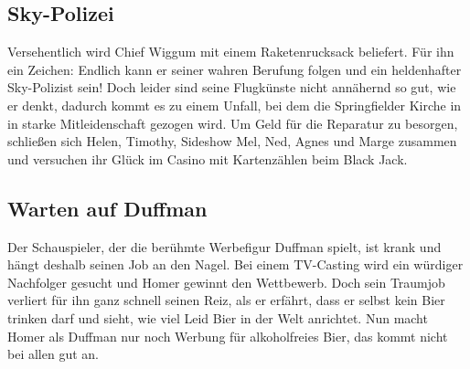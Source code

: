 
\subsection{Sky-Polizei}\label{TABF09}
Versehentlich wird Chief Wiggum mit einem Raketenrucksack beliefert. Für ihn ein Zeichen: Endlich kann er seiner wahren Berufung folgen und ein heldenhafter Sky-Polizist sein! Doch leider sind seine Flugkünste nicht annähernd so gut, wie er denkt, dadurch kommt es zu einem Unfall, bei dem die Springfielder Kirche in in starke Mitleidenschaft gezogen wird. Um Geld für die Reparatur zu besorgen, schließen sich Helen, Timothy, Sideshow Mel, Ned, Agnes und Marge zusammen und versuchen ihr Glück im Casino mit Kartenzählen beim Black Jack.


\subsection{Warten auf Duffman}\label{TABF10}
Der Schauspieler, der die berühmte Werbefigur Duffman spielt, ist krank und hängt deshalb seinen Job an den Nagel. Bei einem TV-Casting wird ein würdiger Nachfolger gesucht und Homer gewinnt den Wettbewerb. Doch sein Traumjob verliert für ihn ganz schnell seinen Reiz, als er erfährt, dass er selbst kein Bier trinken darf und sieht, wie viel Leid Bier in der Welt anrichtet. Nun macht Homer als Duffman nur noch Werbung für alkoholfreies Bier, das kommt nicht bei allen gut an.


